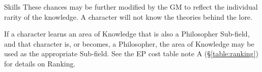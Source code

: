 \begin{Chapter}{Skills}
These chances may be further modified by the GM to reflect the
individual rarity of the knowledge.  A character will not know the
theories behind the lore.

If a character learns an area of Knowledge that is also a Philosopher
Sub-field, and that character is, or becomes, a Philosopher, the area
of Knowledge may be used as the appropriate Sub-field.  See the EP
cost table note A (\S\ref{table:ranking}) for details on Ranking.

\end{Chapter}
